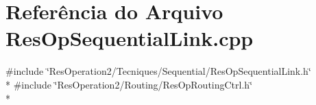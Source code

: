 \section{Referência do Arquivo Res\+Op\+Sequential\+Link.\+cpp}
\label{_res_op_sequential_link_8cpp}
{\ttfamily \#include \char`\"{}Res\+Operation2/\+Tecniques/\+Sequential/\+Res\+Op\+Sequential\+Link.\+h\char`\"{}}\\*
{\ttfamily \#include \char`\"{}Res\+Operation2/\+Routing/\+Res\+Op\+Routing\+Ctrl.\+h\char`\"{}}\\*
